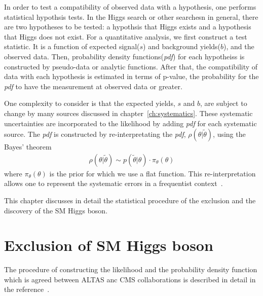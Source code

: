 In order to test a compatibility of observed data with a hypothesis, 
one performs statistical hypothsis tests. In the Higgs search or 
other searchesn in general, there are two hypotheses to be tested: 
a hypothsis that Higgs exists and a hypothesis that Higgs does not exist. 
For a quantitative analysis, we first construct a test statistic. 
It is a function of expected signal($s$) and background yields($b$),
and the observed data. Then, probability density functions(\textit{pdf}) for 
each hypotheiss is constructed by pseudo-data or analytic functions. 
After that, the compatibility of data with each hypothesis is estimated
in terms of p-value, the probability for the \textit{pdf} to have the measurement 
at observed data or greater. 

One complexity to consider is that the 
expected yields, $s$ and $b$, are subject to change by many sources 
discussed in chapter~\ref{ch:systematics}. These systematic uncertainties 
are incorporated to the likelihood by adding \textit{pdf} for each systematic source. 
The \textit{pdf} is constructed by re-interpretating the \textit{pdf}, 
$\rho(\theta | \tilde{\theta})$, using the Bayes' theorem 
\begin{eqnarray} 
\rho(\theta | \tilde{\theta}) 
\sim 
p(\tilde{\theta} | \theta) \cdot \pi_\theta \left( \theta \right)  
\end{eqnarray} 
where $\pi_\theta \left( \theta \right)$ is the prior for which 
we use a flat function. This re-interpretation allows one to 
represent the systematic errors in a frequentist context~\cite{combination_stat}. 

This chapter discusses in detail the statistical procedure of the exclusion 
and the discovery of the SM Higgs boson.  

\section{Exclusion of SM Higgs boson}
\label{sec:stat_exclusion}

The procedure of constructing the likelihood and the probability density function 
which is agreed between ALTAS anc CMS collaborations is
described in detail in the reference~\cite{combination_stat}.

